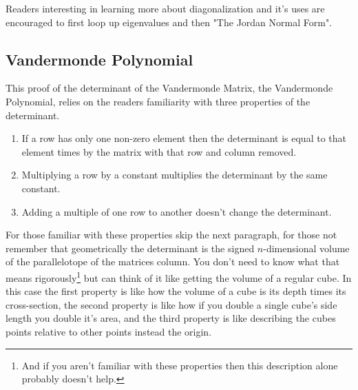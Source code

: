 Readers interesting in learning more about diagonalization and it's uses are encouraged to first loop up eigenvalues and then "The Jordan Normal Form".

\subsection{Vandermonde Polynomial}
\label{appx:vandermonde-polynomial}

This proof of the determinant of the Vandermonde Matrix,
the Vandermonde Polynomial,
relies on the readers familiarity with three properties of the determinant.

\begin{enumerate}
	\item[1] If a row has only one non-zero element then the determinant is equal to that element times by the matrix with that row and column removed. \\
	\item[2] Multiplying a row by a constant multiplies the determinant by the same constant. \\
	\item[3] Adding a multiple of one row to another doesn't change the determinant. \\
\end{enumerate}

For those familiar with these properties skip the next paragraph,
for those not remember that geometrically the determinant is the signed $n$-dimensional volume of the parallelotope of the matrices column.
You don't need to know what that means rigorously\footnote{And if you aren't familiar with these properties then this description alone probably doesn't help.} but can think of it like getting the volume of a regular cube.
In this case the first property is like how the volume of a cube is its depth times its cross-section,
the second property is like how if you double a single cube's side length you double it's area,
and the third property is like describing the cubes points relative to other points instead the origin. 
\\

